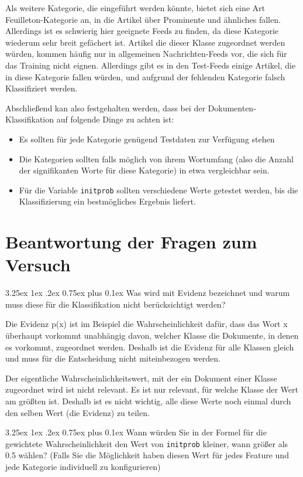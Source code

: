 \documentclass[12pt,a4paper]{scrartcl}
\makeatletter
\renewcommand\subparagraph{\@startsection{subparagraph}{5}{\parindent}%
    {3.25ex \@plus1ex \@minus .2ex}%
    {0.75ex plus 0.1ex}%
    {\normalfont\normalsize\bfseries}}
\makeatother
\begin{document}
Als weitere Kategorie, die eingef\"uhrt werden k\"onnte, bietet sich eine Art Feuilleton-Kategorie an, in die Artikel \"uber Prominente und \"ahnliches fallen. Allerdings ist es schwierig hier geeignete Feeds zu finden, da diese Kategorie wiederum sehr breit gef\"achert ist. Artikel die dieser Klasse zugeordnet werden w\"urden, kommen h\"aufig nur in allgemeinen Nachrichten-Feeds vor, die sich f\"ur das Training nicht eignen. 
Allerdings gibt es in den Test-Feeds einige Artikel, die in diese Kategorie fallen w\"urden, und aufgrund der fehlenden Kategorie falsch Klassifiziert werden. 

Abschlie\ss end kan also festgehalten werden, dass bei der Dokumenten-Klassifikation auf folgende Dinge zu achten ist:
\begin{itemize}
\item{ Es sollten f\"ur jede Kategorie gen\"ugend Testdaten zur Verf\"ugung stehen}
\item{ Die Kategorien sollten falls m\"oglich von ihrem Wortumfang (also die Anzahl der signifikanten Worte f\"ur diese Kategorie) in etwa vergleichbar sein.}
\item{ F\"ur die Variable \lstinline|initprob| sollten verschiedene Werte getestet werden, bis die Klassifizierung ein bestm\"ogliches Ergebnis liefert.}

\end{itemize}

\section*{Beantwortung der Fragen zum Versuch}
\subparagraph{Was wird mit Evidenz bezeichnet und warum muss diese f\"ur die Klassifikation nicht ber\"ucksichtigt werden?}

Die Evidenz p(x) ist im Beispiel die Wahrscheinlichkeit daf\"ur, dass das Wort x \"uberhaupt vorkommt unabh\"angig davon, welcher Klasse die Dokumente, in denen es vorkommt, zugeordnet werden.
Deshalb ist die Evidenz f\"ur alle Klassen gleich und muss f\"ur die Entscheidung nicht miteinbezogen werden. 

Der eigentliche Wahrscheinlichkeitswert, mit der ein Dokument einer Klasse zugeordnet wird ist nicht relevant. Es ist nur relevant, f\"ur welche Klasse der Wert am gr\"o\ss ten ist. Deshalb ist es nicht wichtig, alle diese Werte noch einmal durch den selben Wert (die Evidenz) zu teilen.

\subparagraph{Wann w\"urden Sie in der Formel f\"ur die gewichtete Wahrscheinlichkeit den Wert von \lstinline{initprob} kleiner, wann gr\"o\ss er als 0.5 w\"ahlen? (Falls Sie die M\"oglichkeit haben diesen Wert f\"ur jedes Feature und jede Kategorie individuell zu konfigurieren)}
\end{document}
